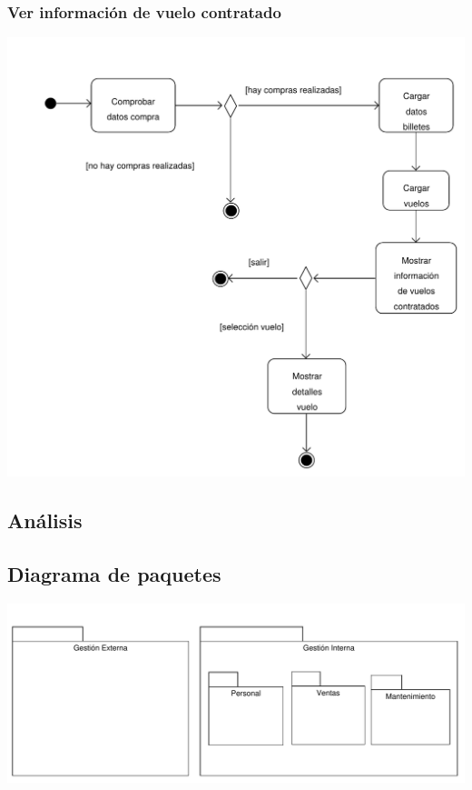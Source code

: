 \documentclass[11pt, a4paper, twoside, titlepage]{article}
\begin{document}
			\subsubsection{Ver información de vuelo contratado}
				\begin{center}
					\includegraphics[scale=.8]{analisis/diagramas/da_verinfovuelocontratado.pdf}
				\end{center}


	\newpage
	
\begin{landscape}
	\section{Análisis}
		\subsection{Diagrama de paquetes}
		\vfill
		\begin{center}
			\hspace*{-.5cm}
			\includegraphics[scale=1]{analisis/diagramas/paquetes.pdf}
		\end{center}
		\vfill
\end{landscape}
\end{document}
